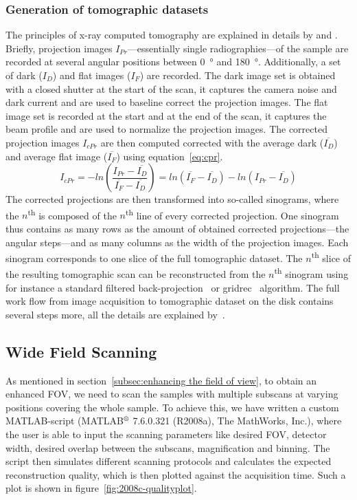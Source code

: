\subsubsection{Generation of tomographic datasets}
The principles of x-ray computed tomography are explained in details by \citet{Kak2002} and \citet{Hsieh2003}. Briefly, projection images $I_{Pr}$---essentially single radiographies---of the sample are recorded at several angular positions between \SI{0}{\degree} and \SI{180}{\degree}. Additionally, a set of dark ($I_{D}$) and flat images ($I_{F}$) are recorded. The dark image set is obtained with a closed shutter at the start of the scan, it captures the camera noise and dark current and are used to baseline correct the projection images. The flat image set is recorded at the start and at the end of the scan, it captures the beam profile and are used to normalize the projection images. The corrected projection images $I_{cPr}$ are then computed corrected with the average dark ($\overline{I_{D}}$) and average flat image ($\overline{I_{F}}$) using equation~\ref{eq:cpr}.
\begin{equation}
	I_{cPr} = -ln\left(\frac{I_{Pr}-\overline{I_{D}}}{\overline{I_{F}}-\overline{I_{D}}}\right)=ln(\overline{I_{F}}-\overline{I_{D}})-ln(I_{Pr}-\overline{I_{D}})
\label{eq:cpr}
\end{equation}
The corrected projections are then transformed into so-called sinograms, where the $n$\textsuperscript{th} is composed of the $n$\textsuperscript{th} line of every corrected projection. One sinogram thus contains as many rows as the amount of obtained corrected projections---the angular steps---and as many columns as the width of the projection images. Each sinogram corresponds to one slice of the full tomographic dataset. The $n$\textsuperscript{th} slice of the resulting tomographic scan can be reconstructed from the $n$\textsuperscript{th} sinogram using for instance a standard filtered back-projection~\cite{Kak2002,Hsieh2003} or gridrec~\cite{Dowd1999} algorithm. The full work flow from image acquisition to tomographic dataset on the disk contains several steps more, all the details are explained by~\citet{Hintermueller2009}.




\subsection{Wide Field Scanning}
As mentioned in section~\ref{subsec:enhancing the field of view}, to obtain an enhanced FOV, we need to scan the samples with multiple subscans at varying positions covering the whole sample. To achieve this, we have written a custom MATLAB-script (MATLAB$^\text{\textregistered}$ 7.6.0.321 (R2008a), The MathWorks, Inc.), where the user is able to input the scanning parameters like desired FOV, detector width, desired overlap between the subscans, magnification and binning. The script then simulates different scanning protocols and calculates the expected reconstruction quality, which is then plotted against the acquisition time. Such a plot is shown in figure~\ref{fig:2008c-qualityplot}.

